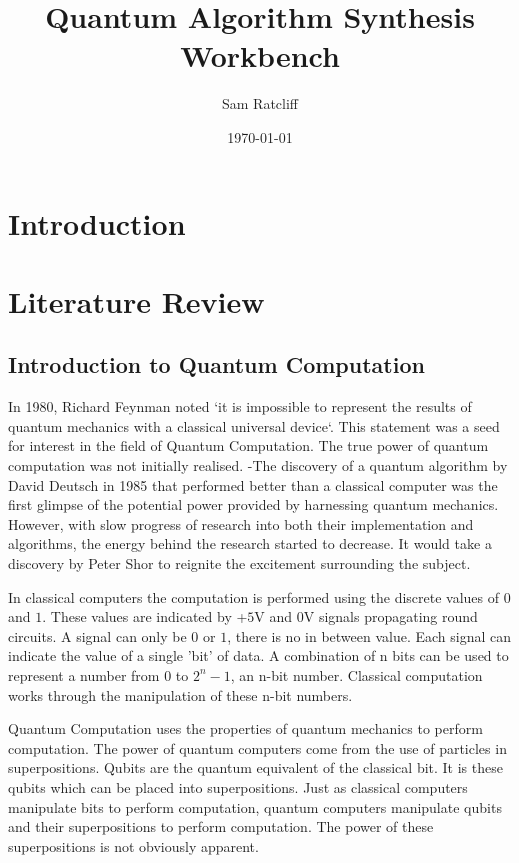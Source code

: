 \documentclass[authoryearcitations]{UoYCSproject}
\author{Sam Ratcliff}
\title{Quantum Algorithm Synthesis Workbench}
\date{\today}
\begin{document}
\maketitle
\listoffigures
\listoftables

\chapter{Introduction}
\chapter{Literature Review}
\section{Introduction to Quantum Computation}
In 1980, Richard Feynman noted `it is impossible to represent the results of quantum mechanics with a classical universal device`\cite{Feynman82simulatingphysics}.
This statement was a seed for interest in the field of Quantum Computation.
The true power of quantum computation was not initially realised.
-The discovery of a quantum algorithm by David Deutsch\cite{Deutsch1985} in 1985 that performed better than a classical computer was the first glimpse of the potential power provided by harnessing quantum mechanics.
However, with slow progress of research into both their implementation and algorithms, the energy behind the research started to decrease.
It would take a discovery by Peter Shor\cite{Shor:1994jg} to reignite the excitement surrounding the subject.  

In classical computers the computation is performed using the discrete values of $0$ and $1$.
These values are indicated by +$5$V and $0$V signals propagating round circuits.
A signal can only be $0$ or $1$, there is no in between value.
Each signal can indicate the value of a single 'bit' of data.
A combination of n bits can be used to represent a number from $0$ to $2^n-1$, an n-bit number.
Classical computation works through the manipulation of these n-bit numbers.


Quantum Computation uses the properties of quantum mechanics to perform computation.
The power of quantum computers come from the use of particles in superpositions.
Qubits are the quantum equivalent of the classical bit.
It is these qubits which can be placed into superpositions.
Just as classical computers manipulate bits to perform computation, quantum computers manipulate qubits and their superpositions to perform computation.
The power of these superpositions is not obviously apparent.
\end{document}
